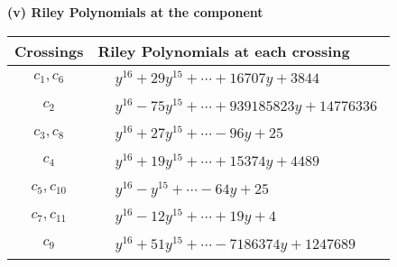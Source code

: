 \documentclass[1p]{elsarticle_modified}
\theoremstyle{definition}
\begin{document}
\flushleft \textbf{(v) Riley Polynomials at the component}\newline \\
\begin{tabular}{m{50pt}|m{274pt}}
Crossings & \hspace{64pt}Riley Polynomials at each crossing \\
\hline $$\begin{aligned}c_{1},c_{6}\end{aligned}$$&$\begin{aligned}
&y^{16}+29 y^{15}+\cdots+16707 y+3844
\end{aligned}$\\
\hline $$\begin{aligned}c_{2}\end{aligned}$$&$\begin{aligned}
&y^{16}-75 y^{15}+\cdots+939185823 y+14776336
\end{aligned}$\\
\hline $$\begin{aligned}c_{3},c_{8}\end{aligned}$$&$\begin{aligned}
&y^{16}+27 y^{15}+\cdots-96 y+25
\end{aligned}$\\
\hline $$\begin{aligned}c_{4}\end{aligned}$$&$\begin{aligned}
&y^{16}+19 y^{15}+\cdots+15374 y+4489
\end{aligned}$\\
\hline $$\begin{aligned}c_{5},c_{10}\end{aligned}$$&$\begin{aligned}
&y^{16}- y^{15}+\cdots-64 y+25
\end{aligned}$\\
\hline $$\begin{aligned}c_{7},c_{11}\end{aligned}$$&$\begin{aligned}
&y^{16}-12 y^{15}+\cdots+19 y+4
\end{aligned}$\\
\hline $$\begin{aligned}c_{9}\end{aligned}$$&$\begin{aligned}
&y^{16}+51 y^{15}+\cdots-7186374 y+1247689
\end{aligned}$\\
\hline
\end{tabular}\\~\\
\end{document}
